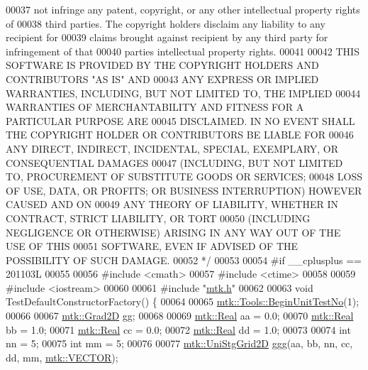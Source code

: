 \begin{DoxyCode}
00037 \textcolor{comment}{not infringe any patent, copyright, or any other intellectual property rights of}
00038 \textcolor{comment}{third parties. The copyright holders disclaim any liability to any recipient for}
00039 \textcolor{comment}{claims brought against recipient by any third party for infringement of that}
00040 \textcolor{comment}{parties intellectual property rights.}
00041 \textcolor{comment}{}
00042 \textcolor{comment}{THIS SOFTWARE IS PROVIDED BY THE COPYRIGHT HOLDERS AND CONTRIBUTORS "AS IS" AND}
00043 \textcolor{comment}{ANY EXPRESS OR IMPLIED WARRANTIES, INCLUDING, BUT NOT LIMITED TO, THE IMPLIED}
00044 \textcolor{comment}{WARRANTIES OF MERCHANTABILITY AND FITNESS FOR A PARTICULAR PURPOSE ARE}
00045 \textcolor{comment}{DISCLAIMED. IN NO EVENT SHALL THE COPYRIGHT HOLDER OR CONTRIBUTORS BE LIABLE FOR}
00046 \textcolor{comment}{ANY DIRECT, INDIRECT, INCIDENTAL, SPECIAL, EXEMPLARY, OR CONSEQUENTIAL DAMAGES}
00047 \textcolor{comment}{(INCLUDING, BUT NOT LIMITED TO, PROCUREMENT OF SUBSTITUTE GOODS OR SERVICES;}
00048 \textcolor{comment}{LOSS OF USE, DATA, OR PROFITS; OR BUSINESS INTERRUPTION) HOWEVER CAUSED AND ON}
00049 \textcolor{comment}{ANY THEORY OF LIABILITY, WHETHER IN CONTRACT, STRICT LIABILITY, OR TORT}
00050 \textcolor{comment}{(INCLUDING NEGLIGENCE OR OTHERWISE) ARISING IN ANY WAY OUT OF THE USE OF THIS}
00051 \textcolor{comment}{SOFTWARE, EVEN IF ADVISED OF THE POSSIBILITY OF SUCH DAMAGE.}
00052 \textcolor{comment}{*/}
00053 
00054 \textcolor{preprocessor}{#if \_\_cplusplus == 201103L}
00055 
00056 \textcolor{preprocessor}{#include <cmath>}
00057 \textcolor{preprocessor}{#include <ctime>}
00058 
00059 \textcolor{preprocessor}{#include <iostream>}
00060 
00061 \textcolor{preprocessor}{#include "\hyperlink{mtk_8h}{mtk.h}"}
00062 
00063 \textcolor{keywordtype}{void} TestDefaultConstructorFactory() \{
00064 
00065   \hyperlink{classmtk_1_1Tools_a26ee906d28523378522a75e25c3a4e19}{mtk::Tools::BeginUnitTestNo}(1);
00066 
00067   \hyperlink{classmtk_1_1Grad2D}{mtk::Grad2D} gg;
00068 
00069   \hyperlink{group__c01-roots_gac080bbbf5cbb5502c9f00405f894857d}{mtk::Real} aa = 0.0;
00070   \hyperlink{group__c01-roots_gac080bbbf5cbb5502c9f00405f894857d}{mtk::Real} bb = 1.0;
00071   \hyperlink{group__c01-roots_gac080bbbf5cbb5502c9f00405f894857d}{mtk::Real} cc = 0.0;
00072   \hyperlink{group__c01-roots_gac080bbbf5cbb5502c9f00405f894857d}{mtk::Real} dd = 1.0;
00073 
00074   \textcolor{keywordtype}{int} nn = 5;
00075   \textcolor{keywordtype}{int} mm = 5;
00076 
00077   \hyperlink{classmtk_1_1UniStgGrid2D}{mtk::UniStgGrid2D} ggg(aa, bb, nn, cc, dd, mm, \hyperlink{namespacemtk_ga4c54f2a329cfb4e56213b02a259d19e2a3d8cb27a993651a74d67fb8c98ae91b2}{mtk::VECTOR});

\end{DoxyCode}
